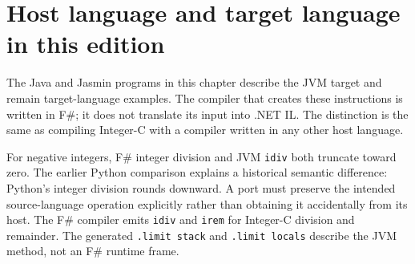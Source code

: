\section{Host language and target language in this edition}
The Java and Jasmin programs in this chapter describe the JVM target and remain target-language examples.
The compiler that creates these instructions is written in F\#; it does not translate its input into .NET IL.
The distinction is the same as compiling Integer-C with a compiler written in any other host language.

For negative integers, F\# integer division and JVM \texttt{idiv} both truncate toward zero.
The earlier Python comparison explains a historical semantic difference: Python's integer division rounds downward.
A port must preserve the intended source-language operation explicitly rather than obtaining it accidentally from its host.
The F\# compiler emits \texttt{idiv} and \texttt{irem} for Integer-C division and remainder.
The generated \texttt{.limit stack} and \texttt{.limit locals} describe the JVM method, not an F\# runtime frame.

